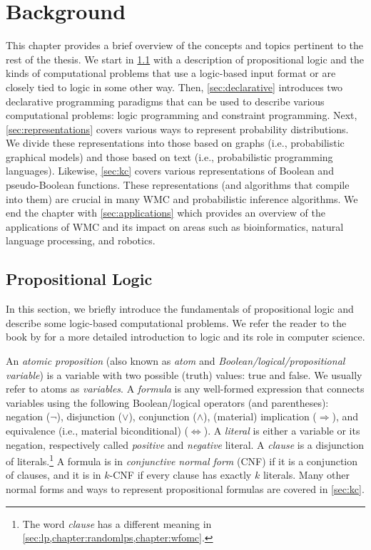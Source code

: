 \chapter{Background}


This chapter provides a brief overview of the concepts and topics pertinent to the rest of the thesis. We start in \cref{sec:proplogic} with a description of propositional logic and the kinds of computational problems that use a logic-based input format or are closely tied to logic in some other way. Then, \cref{sec:declarative} introduces two declarative programming paradigms that can be used to describe various computational problems: logic programming and constraint programming. Next, \cref{sec:representations} covers various ways to represent probability distributions. We divide these representations into those based on graphs (i.e., probabilistic graphical models) and those based on text (i.e., probabilistic programming languages). Likewise, \cref{sec:kc} covers various representations of Boolean and pseudo-Boolean functions. These representations (and algorithms that compile into them) are crucial in many WMC and probabilistic inference algorithms. We end the chapter with \cref{sec:applications} which provides an overview of the applications of WMC and its impact on areas such as bioinformatics, natural language processing, and robotics.

\section{Propositional Logic} \label{sec:proplogic}

In this section, we briefly introduce the fundamentals of propositional logic and describe some logic-based computational problems. We refer the reader to the book by \citet{DBLP:books/daglib/0029942} for a more detailed introduction to logic and its role in computer science.

An \emph{atomic proposition} (also known as \emph{atom} and \emph{Boolean/logical/propositional variable}) is a variable with two possible (truth) values: true and false. We usually refer to atoms as \emph{variables}. A \emph{formula} is any well-formed expression that connects variables using the following Boolean/logical operators (and parentheses): negation ($\neg$), disjunction ($\lor$), conjunction ($\land$), (material) implication ($\Rightarrow$), and equivalence (i.e., material biconditional) ($\Leftrightarrow$). A \emph{literal} is either a variable or its negation, respectively called \emph{positive} and \emph{negative} literal. A \emph{clause} is a disjunction of literals.\footnote{The word \emph{clause} has a different meaning in \cref{sec:lp,chapter:randomlps,chapter:wfomc}.} A formula is in \emph{conjunctive normal form} (CNF) if it is a conjunction of clauses, and it is in $k$-CNF if every clause has exactly $k$ literals. Many other normal forms and ways to represent propositional formulas are covered in \cref{sec:kc}.

